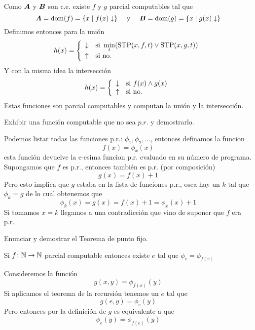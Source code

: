 \documentclass[leqno, 12pt, twoside,letterpaper]{book}
\begin{document}
\begin{solucion}
\noindent Como $\bm{A}$ y $\bm{B}$ son c.e. existe $f$ y $g$ parcial computables tal que
	\[ \bm{A} = \mbox{dom}(f) = \{ x \mid f(x) \downarrow \} \mbox{ \quad y \quad }
	   \bm{B} = \mbox{dom}(g) = \{ x \mid g(x) \downarrow \}\]
Definimos entonces para la unión
	\[ h(x) = \left\{ \begin{array}{ll} \downarrow & \mbox{si } \min\limits_t(\mbox{STP}(x, f, t) \lor \mbox{STP}(x, g, t)) \\ \uparrow & \mbox{} \mbox{si no.} \end{array} \right. \]
Y con la misma idea la intersección
	\[ h(x) = \left\{ \begin{array}{ll} \downarrow & \mbox{si } f(x) \land g(x) \\ \uparrow & \mbox{} \mbox{si no.} \end{array} \right. \]
Estas funciones son parcial computables y computan la unión y la intersección.
\end{solucion}

\begin{ej}{1}
    Exhibir una función computable que no sea $p.r.$ y demostrarlo.
\end{ej}

\begin{solucion}
Podemos listar todas las funciones p.r.: $\phi_1, \phi_2, \dots$, entonces definamos la funcion \[ f(x) = \phi_{x}(x) \] esta función devuelve la e-esima funcion p.r. evaluado en su número de programa. Supongamos que $f$ es p.r., entonces también es p.r. (por composición) \[ g(x) = f(x) + 1 \] Pero esto implica que $g$ estaba en la lista de funciones p.r., osea hay un $k$ tal que $\phi_k = g$ de lo cual obtenemos que \[ \phi_k(x) = g(x) = f(x) + 1 = \phi_x(x) + 1 \] Si tomamos $x = k$ llegamos a una contradicción que vino de suponer que $f$ era p.r.
\end{solucion}

\begin{ej}{1}
    Enunciar y demostrar el Teorema de punto fijo.
\end{ej}

\begin{solucion}
\begin{teo}{}
Si $f \colon \mathbb{N} \to \mathbb{N}$ parcial computable entonces existe $e$ tal que $\phi_e = \phi_{f(e)}$
\end{teo}

\begin{dem}
Consideremos la función \[ g(x, y) = \phi_{f(x)}(y) \] Si aplicamos el teorema de la recursión tenemos un $e$ tal que \[ g(e, y) = \phi_{e}(y) \] Pero entonces por la definición de $g$ es equivalente a que
	\[ \phi_{e}(y) = \phi_{f(e)}(y) \]
\end{dem}


\end{solucion}
\end{document}
